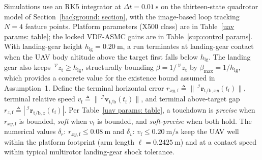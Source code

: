 \documentclass{IEEEtaes}
\begin{document}
Simulations use an RK5 integrator at $\Delta t=0.01~\text{s}$ on the thirteen-state quadrotor model of Section~\ref{background: section}, with the image-based loop tracking $N=4$ feature points. Platform parameters (X500 class) are in Table~\ref{uav params: table}; the locked VDF-ASMC gains are in Table~\ref{sup:control params}. With landing-gear height $h_\text{lg}=0.20~\text{m}$, a run terminates at landing-gear contact when the UAV body altitude above the target first falls below $h_\text{lg}$. The landing gear also keeps $\,^\mathcal{V}z_\text{t}\ge h_\text{lg}$, structurally bounding $\beta=1/\,^\mathcal{V}z_\text{t}$ by $\beta_\text{max}=1/h_\text{lg}$, which provides a concrete value for the existence bound assumed in Assumption~1. Define the terminal horizontal error $r_{xy,\text{f}} \triangleq \|\,^\mathcal{I}\boldsymbol{r}_{\text{t/b},xy}(t_\text{f})\|$, terminal relative speed $v_\text{f} \triangleq \|\,^\mathcal{I}\boldsymbol{v}_{\text{t/b}}(t_\text{f})\|$, and terminal above-target gap $r_{z,\text{f}} \triangleq |\,^\mathcal{I}\boldsymbol{r}_{\text{t/b},z}(t_\text{f})|$. Per Table~\ref{uav params: table}, a touchdown is \emph{precise} when $r_{xy,\text{f}}$ is bounded, \emph{soft} when $v_\text{f}$ is bounded, and \emph{soft-precise} when both hold. The numerical values $\delta_r$: $r_{xy,\text{f}}\le 0.08~\text{m}$ and $\delta_v$: $v_\text{f}\le 0.20~\text{m/s}$ keep the UAV well within the platform footprint (arm length $\ell=0.2425~\text{m}$) and at a contact speed within typical multirotor landing-gear shock tolerance.
\end{document}
